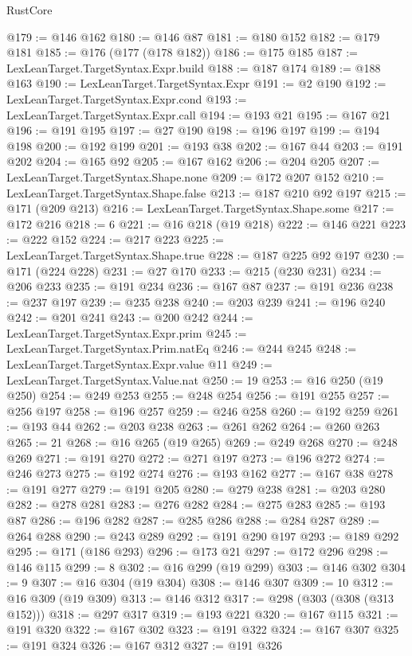 \begin{lexlean}{RustCore}
\begin{coremodule}
@179 := @146 @162
@180 := @146 @87
@181 := @180 @152
@182 := @179 @181
@185 := @176 (@177 (@178 @182))
@186 := @175 @185
@187 := LexLeanTarget.TargetSyntax.Expr.build
@188 := @187 @174
@189 := @188 @163
@190 := LexLeanTarget.TargetSyntax.Expr
@191 := @2 @190
@192 := LexLeanTarget.TargetSyntax.Expr.cond
@193 := LexLeanTarget.TargetSyntax.Expr.call
@194 := @193 @21
@195 := @167 @21
@196 := @191 @195
@197 := @27 @190
@198 := @196 @197
@199 := @194 @198
@200 := @192 @199
@201 := @193 @38
@202 := @167 @44
@203 := @191 @202
@204 := @165 @92
@205 := @167 @162
@206 := @204 @205
@207 := LexLeanTarget.TargetSyntax.Shape.none
@209 := @172 @207 @152
@210 := LexLeanTarget.TargetSyntax.Shape.false
@213 := @187 @210 @92 @197
@215 := @171 (@209 @213)
@216 := LexLeanTarget.TargetSyntax.Shape.some
@217 := @172 @216
@218 := 6
@221 := @16 @218 (@19 @218)
@222 := @146 @221
@223 := @222 @152
@224 := @217 @223
@225 := LexLeanTarget.TargetSyntax.Shape.true
@228 := @187 @225 @92 @197
@230 := @171 (@224 @228)
@231 := @27 @170
@233 := @215 (@230 @231)
@234 := @206 @233
@235 := @191 @234
@236 := @167 @87
@237 := @191 @236
@238 := @237 @197
@239 := @235 @238
@240 := @203 @239
@241 := @196 @240
@242 := @201 @241
@243 := @200 @242
@244 := LexLeanTarget.TargetSyntax.Expr.prim
@245 := LexLeanTarget.TargetSyntax.Prim.natEq
@246 := @244 @245
@248 := LexLeanTarget.TargetSyntax.Expr.value @11
@249 := LexLeanTarget.TargetSyntax.Value.nat
@250 := 19
@253 := @16 @250 (@19 @250)
@254 := @249 @253
@255 := @248 @254
@256 := @191 @255
@257 := @256 @197
@258 := @196 @257
@259 := @246 @258
@260 := @192 @259
@261 := @193 @44
@262 := @203 @238
@263 := @261 @262
@264 := @260 @263
@265 := 21
@268 := @16 @265 (@19 @265)
@269 := @249 @268
@270 := @248 @269
@271 := @191 @270
@272 := @271 @197
@273 := @196 @272
@274 := @246 @273
@275 := @192 @274
@276 := @193 @162
@277 := @167 @38
@278 := @191 @277
@279 := @191 @205
@280 := @279 @238
@281 := @203 @280
@282 := @278 @281
@283 := @276 @282
@284 := @275 @283
@285 := @193 @87
@286 := @196 @282
@287 := @285 @286
@288 := @284 @287
@289 := @264 @288
@290 := @243 @289
@292 := @191 @290 @197
@293 := @189 @292
@295 := @171 (@186 @293)
@296 := @173 @21
@297 := @172 @296
@298 := @146 @115
@299 := 8
@302 := @16 @299 (@19 @299)
@303 := @146 @302
@304 := 9
@307 := @16 @304 (@19 @304)
@308 := @146 @307
@309 := 10
@312 := @16 @309 (@19 @309)
@313 := @146 @312
@317 := @298 (@303 (@308 (@313 @152)))
@318 := @297 @317
@319 := @193 @221
@320 := @167 @115
@321 := @191 @320
@322 := @167 @302
@323 := @191 @322
@324 := @167 @307
@325 := @191 @324
@326 := @167 @312
@327 := @191 @326

\end{coremodule}
\end{lexlean}
